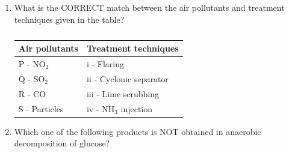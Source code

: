 \documentclass[journal,12pt,onecolumn]{article}
\theoremstyle{remark}
\begin{document}
\begin{enumerate}
    \item What is the CORRECT match between the air pollutants and treatment techniques
    given in the table?
    \begin{table}[H]
        \centering
        \begin{tabular}{|l|l|}
        \hline
        \textbf{Air pollutants} & \textbf{Treatment techniques} \\ \hline
        P - NO$_2$ & i - Flaring \\
        Q - SO$_2$ & ii - Cyclonic separator \\
        R - CO & iii - Lime scrubbing \\
        S - Particles & iv - NH$_3$ injection \\ \hline
        \end{tabular}
        \caption{}
        \label{tab:q25}
    \end{table}
    
    \hfill{}
    \begin{enumerate}
    \end{enumerate}
    
    \item Which one of the following products is NOT obtained in anaerobic decomposition
    of glucose?
    
    \hfill{}
    \begin{enumerate}
    \end{enumerate}


\end{enumerate}
\end{document}
